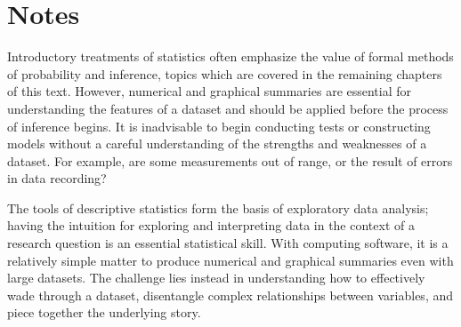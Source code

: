 \section{Notes}
\label{notesChapterData}

Introductory treatments of statistics often emphasize the value of formal methods of probability and inference, topics which are covered in the remaining chapters of this text. However, numerical and graphical summaries are essential for understanding the features of a dataset and should be applied before the process of inference begins. It is inadvisable to begin conducting tests or constructing models without a careful understanding of the strengths and weaknesses of a dataset. For example, are some measurements out of range, or the result of errors in data recording?

The tools of descriptive statistics form the basis of exploratory data analysis; having the intuition for exploring and interpreting data in the context of a research question is an essential statistical skill. With computing software, it is a relatively simple matter to produce numerical and graphical summaries even with large datasets. The challenge lies instead in understanding how to effectively wade through a dataset, disentangle complex relationships between variables, and piece together the underlying story. 

